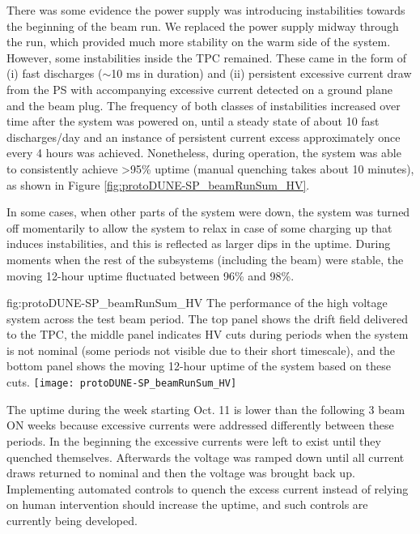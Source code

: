 There was some evidence the power supply was introducing instabilities towards the beginning of the beam run.
We replaced the power supply midway through the run, which provided much more stability on the warm side of the  system.
However, some instabilities inside the TPC remained.
These came in the form of (i) fast discharges ($\sim$10 ms in duration) and (ii) persistent excessive current draw from the PS with accompanying excessive current detected on a ground plane and the beam plug.
The frequency of both classes of instabilities increased over time after the system was powered on, until a steady state of about 10 fast discharges/day and an instance of persistent current excess approximately once every 4 hours was achieved.
Nonetheless, during operation, the  system was able to consistently achieve >95\% uptime (manual quenching takes about 10 minutes), as shown in Figure \ref{fig:protoDUNE-SP_beamRunSum_HV}.

In some cases, when other parts of the system were down, the  system was turned off momentarily to allow the system to relax in case of some charging up that induces instabilities, and this is reflected as larger dips in the uptime.
During moments when the rest of the subsystems (including the beam) were stable, the moving 12-hour  uptime fluctuated between 96\% and 98\%.

\begin{dunefigure}
{fig:protoDUNE-SP_beamRunSum_HV}
{The performance of the high voltage system across the test beam period. The top panel shows the drift field delivered to the TPC, the middle panel indicates HV cuts during periods when the system is not nominal (some periods not visible due to their short timescale), and the bottom panel shows the moving 12-hour uptime of the  system based on these  cuts.
}
\texttt{[image: protoDUNE-SP\_beamRunSum\_HV]}
\end{dunefigure}

The uptime during the week starting Oct. 11 is lower than the following 3 beam ON weeks because excessive currents were addressed differently between these periods.
In the beginning the excessive currents were left to exist until they quenched themselves.
Afterwards the voltage was ramped down until all current draws returned to nominal and then the voltage was brought back up.
Implementing automated controls to quench the excess current instead of relying on human intervention should increase the uptime, and such controls are currently being developed.

